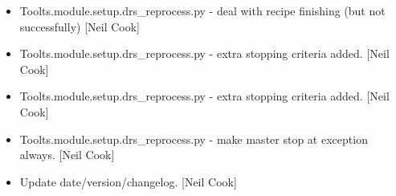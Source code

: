 \documentclass[a4paper,10pt,english]{report}
\begin{document}
\begin{itemize}
\item {} 
Toolts.module.setup.drs\_reprocess.py - deal with recipe finishing (but
not successfully) {[}Neil Cook{]}

\item {} 
Toolts.module.setup.drs\_reprocess.py - extra stopping criteria added.
{[}Neil Cook{]}

\item {} 
Toolts.module.setup.drs\_reprocess.py - extra stopping criteria added.
{[}Neil Cook{]}

\item {} 
Toolts.module.setup.drs\_reprocess.py - make master stop at exception
always. {[}Neil Cook{]}

\item {} 
Update date/version/changelog. {[}Neil Cook{]}

\end{itemize}
\end{document}
